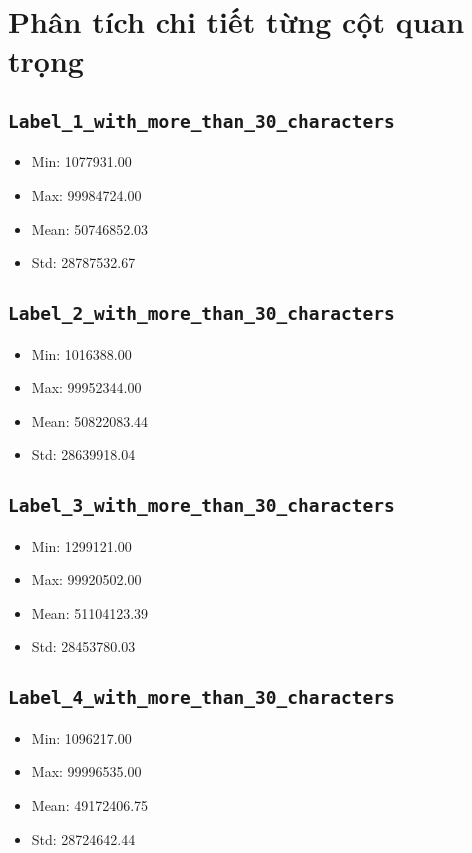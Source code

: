 \documentclass[12pt]{article}
\begin{document}
\section{Phân tích chi tiết từng cột quan trọng}

\subsection{\texttt{Label\_1\_with\_more\_than\_30\_characters}}
\begin{itemize}
    \item Min: 1077931.00
    \item Max: 99984724.00
    \item Mean: 50746852.03
    \item Std: 28787532.67
\end{itemize}

\subsection{\texttt{Label\_2\_with\_more\_than\_30\_characters}}
\begin{itemize}
    \item Min: 1016388.00
    \item Max: 99952344.00
    \item Mean: 50822083.44
    \item Std: 28639918.04
\end{itemize}

\subsection{\texttt{Label\_3\_with\_more\_than\_30\_characters}}
\begin{itemize}
    \item Min: 1299121.00
    \item Max: 99920502.00
    \item Mean: 51104123.39
    \item Std: 28453780.03
\end{itemize}

\subsection{\texttt{Label\_4\_with\_more\_than\_30\_characters}}
\begin{itemize}
    \item Min: 1096217.00
    \item Max: 99996535.00
    \item Mean: 49172406.75
    \item Std: 28724642.44
\end{itemize}
\end{document}

